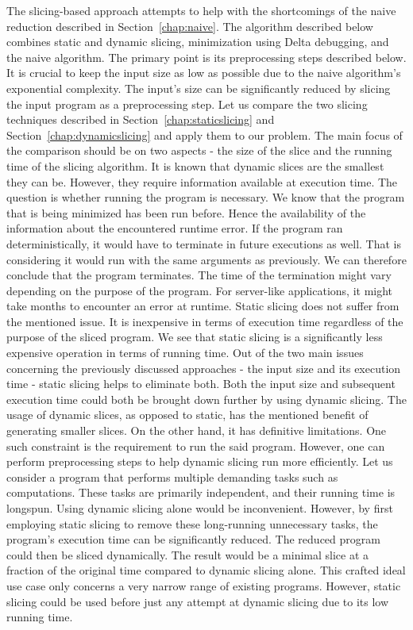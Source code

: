The slicing-based approach attempts to help with the shortcomings of 
the naive reduction described in Section~\ref{chap:naive}.
The algorithm described below combines static and dynamic slicing, 
minimization using Delta debugging, and the naive algorithm. 
The primary point is its preprocessing steps described below. 
It is crucial to keep the input size as low as possible due to the naive 
algorithm's exponential complexity.  
The input's size can be significantly reduced by slicing the input program 
as a preprocessing step.  
Let us compare the two slicing techniques described 
in Section~\ref{chap:staticslicing} and Section~\ref{chap:dynamicslicing} and 
apply them to our problem. 
The main focus of the comparison should be on two aspects - the size of 
the slice and the running time of the slicing algorithm. 
It is known that dynamic slices are the smallest they can be. 
However, they require information available at execution time. 
The question is whether running the program is necessary. 
We know that the program that is being minimized has been run before. 
Hence the availability of the information about the encountered runtime 
error. 
If the program ran deterministically, it would have to terminate in future 
executions as well.  
That is considering it would run with the same arguments as previously.  
We can therefore conclude that the program terminates.  
The time of the termination might vary depending on the purpose of 
the program.  
For server-like applications, it might take months to encounter an error 
at runtime. 
Static slicing does not suffer from the mentioned issue.  
It is inexpensive in terms of execution time regardless of the purpose of 
the sliced program. 
We see that static slicing is a significantly less expensive operation in 
terms of running time. 
Out of the two main issues concerning the previously discussed 
approaches - the input size and its execution time - static slicing helps to 
eliminate both. 
Both the input size and subsequent execution time could both be brought down 
further by using dynamic slicing.  
The usage of dynamic slices, as opposed to static, has the mentioned benefit 
of generating smaller slices.
On the other hand, it has definitive limitations. 
One such constraint is the requirement to run the said program. 
However, one can perform preprocessing steps to help dynamic slicing run more 
efficiently.  
Let us consider a program that performs multiple demanding tasks such as 
computations.  
These tasks are primarily independent, and their running time is longspun.  
Using dynamic slicing alone would be inconvenient.  
However, by first employing static slicing to remove these long-running 
unnecessary tasks, the program's execution time can be significantly reduced.  
The reduced program could then be sliced dynamically.  
The result would be a minimal slice at a fraction of the original time 
compared to dynamic slicing alone. 
This crafted ideal use case only concerns a very narrow range of existing 
programs.  
However, static slicing could be used before just any attempt at dynamic 
slicing due to its low running time. 

